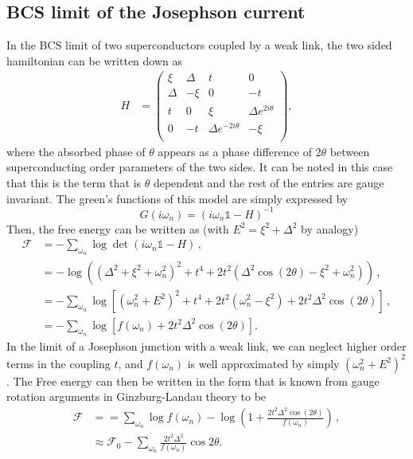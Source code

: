 \subsection{BCS limit of the Josephson current}
In the BCS limit of two superconductors coupled by a weak link, the two sided hamiltonian can be written down as~\cite{tummuru2022josephson}
\begin{align}
    H &= \left(
    \begin{array}{cccc}
     \xi  & \Delta  & t & 0 \\
     \Delta  & -\xi  & 0 & -t \\
     t & 0 & \xi  & \Delta  e^{2 i \theta } \\
     0 & -t & \Delta  e^{-2 i \theta } & -\xi  \\
    \end{array}
    \right), 
\end{align}
where the absorbed phase of $\theta$ appears as a phase difference of $2\theta$ between superconducting order parameters of the two sides. It can be noted in this case that this is the term that is $\theta$ dependent and the rest of the entries are gauge invariant.
%
The green's functions of this model are simply expressed by 
\begin{equation} 
    G(i\omega_n) = \left(i\omega_n \mathbb{1} - H \right)^{-1}
\end{equation}
%
Then, the free energy can be written as (with $E^2 = \xi^2 + \Delta^2 $ by analogy)
\begin{align}
    \mathcal{F} &= -\sum_{\omega_n} \log\det\left(i\omega_n \mathbb{1} - H\right) \, , \nonumber\\
    &= -\log \left(\left(\Delta ^2+\xi ^2+\omega_n ^2\right)^2+t^4+2 t^2 \left(\Delta ^2 \cos (2 \theta )-\xi ^2+\omega_n ^2\right)\right) \, , \nonumber \\ 
    &= -\sum_{\omega_n} \log\left[(\omega_n^2 + E^2)^2 + t^4 + 2t^2(\omega_n^2-\xi^2) + 2t^2\Delta^2\cos(2\theta)\right] \, , \nonumber \\
    &= -\sum_{\omega_n}\log\left[f(\omega_n) + 2t^2\Delta^2\cos(2\theta)\right].
\end{align}
In the limit of a Josephson junction with a weak link, we can neglect higher order terms in the coupling $t$, and $f(\omega_n)$ is well approximated by simply $(\omega_n^2 + E^2)^2$. 
The Free energy can then be written in the form that is known from gauge rotation arguments in Ginzburg-Landau theory to be 
\begin{align}
    \mathcal{F} &= =\sum_{\omega_n} \log f(\omega_n) - \log\left(1+ \frac{2t^2\Delta^2\cos(2\theta)}{f(\omega_n)}\right) \, , \\
    &\approx \mathcal{F}_0 - \sum_{\omega_n} \frac{2t^2\Delta^2}{f(\omega_n)} \cos{2\theta}. 
    \label{eq:FEBCSbare}
\end{align}
